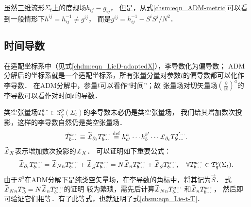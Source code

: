 虽然三维流形$\Sigma_t$上的度规场$h_{ij}\equiv g_{ij}$，
但是，从式\eqref{chsm:eqn_ADM-metric}可以看到一般情形下$h^{ij}=h_{ij}^{-1}\neq g^{ij}$，
而是$g^{ij}=h_{ij}^{-1} - S^i S^j/N^2$．




\subsection{时间导数}

在适配坐标系中（见式\eqref{chdm:eqn_LieD-adaptedX}），李导数化为偏导数；
ADM分解后的坐标系就是一个适配坐标系，所有张量分量对参数$t$的偏导数都可以化作李导数．
在ADM分解中，参量$t$可以看作“时间”；故
张量场对切矢量场$(\frac{\partial }{\partial t})^a$的李导数可以看作对时间$t$的导数．

类空张量场$T^{a\cdots}_{b\cdots}\in \mathfrak{T}^p_q(\Sigma_t)$的李导数未必仍是类空张量场，
我们给其增加数次投影，这样的李导数自然仍是类空张量场．
\begin{equation}
    \dot{T}^{a\cdots}_{b\cdots} \equiv \widetilde{\Lie}_{\partial_t}{T}^{a\cdots}_{b\cdots}
    \overset{\mathrm {def}}{=} h^a_{a'}\cdots h^{b'}_{b}\cdots {\Lie}_{\partial_t}{T}^{a'\cdots}_{b'\cdots} .
\end{equation}
$\widetilde{\Lie}_X$表示增加数次投影的${\Lie}_X$．
可以证明如下重要公式：
\begin{equation}\label{chsm:eqn_Lie-t-T}
    \widetilde{\Lie}_{\partial_t}{T}^{a\cdots}_{b\cdots}
    = \widetilde{\Lie}_{N n}{T}^{a\cdots}_{b\cdots}
     +\widetilde{\Lie}_{\vec{S}}{T}^{a\cdots}_{b\cdots}
    = N \widetilde{\Lie}_{n}{T}^{a\cdots}_{b\cdots}
    +\widetilde{\Lie}_{\vec{S}}{T}^{a\cdots}_{b\cdots} ,
    \quad \forall T^{a\cdots}_{b\cdots}\in \mathfrak{T}^p_q(\Sigma_t).
\end{equation}
由于$S^a$在ADM分解下是纯类空矢量场，在李导数的角标中，将其记为$\vec{S}$．
式$\widetilde{\Lie}_{Nn}{T}^a_{\cdot b}=N\widetilde{\Lie}_{n}{T}^{a\cdots}_{b\cdots}$的证明
较为繁琐，需先后计算$\widetilde{\Lie}_{Nn}{T}^{a\cdots}_{b\cdots}$
和$\widetilde{\Lie}_{n}{T}^{a\cdots}_{b\cdots}$，
然后即可验证它们相等．有了此等式，也就证明了式\eqref{chsm:eqn_Lie-t-T}．

